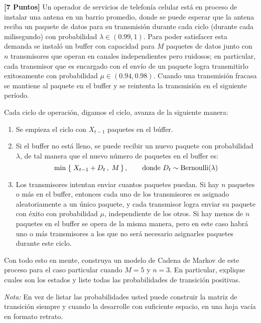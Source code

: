 \documentclass[ a4paper, twoside, 11pt]{article}
\begin{document}
\begin{problem}
\textbf{[7 Puntos]} Un operador de servicios de telefon\'ia celular est\'a en proceso de instalar una antena en un barrio promedio, donde se puede esperar que la antena reciba un paquete de datos para su transmisi\'on durante cada ciclo (\eg durante cada milisegundo) con probabilidad $\lambda \in (0.99,1)$. Para poder satisfacer esta demanda se instal\'o un buffer con capacidad para $M$ paquetes de datos junto con $n$ transmisores que operan en canales independientes pero ruidosos; en particular, cada transmisor que es encargado con el env\'io de un paquete logra transmitirlo exitosamente con probabilidad $\mu \in (0.94,0.98)$. Cuando una transmisi\'on fracasa se mantiene al paquete en el buffer y se reintenta la transmisi\'on en el siguiente per\'iodo. 

Cada ciclo de operaci\'on, digamos el \tavo ciclo, avanza de la siguiente manera: 
\begin{enumerate}
\item Se empieza el ciclo con $X_{t-1}$ paquetes en el b\'uffer. 
\item Si el buffer no est\'a lleno, se puede recibir un nuevo paquete con probabilidad $\lambda$, de tal manera que el nuevo n\'umero de paquetes en el buffer es: 
\[
\min \; \{ \; X_{t-1} + D_t \, , \; M \, \} \, ,
\qquad \text{donde } D_t \sim \text{Bernoulli}(\lambda)
\]
\item Los transmisores intentan enviar cuantos paquetes puedan. Si hay $n$ paquetes o m\'as en el buffer, entonces cada uno de los transmisores es asignado aleatoriamente a un \'unico paquete, y cada transmisor logra enviar su paquete con \'exito con probabilidad $\mu$, independiente de los otros. Si hay menos de $n$ paquetes en el buffer se opera de la misma manera, pero en este caso habr\'a uno o m\'as transmisores a los que no ser\'a necesario asignarles paquetes durante este ciclo. 
\end{enumerate}

Con todo esto en mente, construya un modelo de Cadena de Markov de este proceso para el caso particular cuando $M = 5$ y $n = 3$. En particular, explique cuales son los estados y liste todas las probabilidades de transici\'on positivas. 

\emph{Nota:} En vez de listar las probabilidades usted puede construir la matriz de transici\'on siempre y cuando la desarrolle con suficiente espacio, \eg en una hoja vac\'ia en formato retrato. 


\end{problem}
\end{document}
